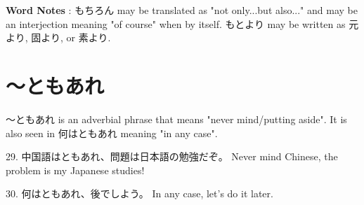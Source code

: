 \par{\textbf{Word Notes }: もちろん may be translated as "not only\dothyp{}\dothyp{}\dothyp{}but also\dothyp{}\dothyp{}\dothyp{}" and may be an interjection meaning "of course" when by itself. もとより may be written as 元より, 固より, or 素より. }
      
\section{～ともあれ}
 
\par{ ～ともあれ is an adverbial phrase that means "never mind\slash putting aside". It is also seen in 何はともあれ meaning "in any case". }

\par{29. 中国語はともあれ、問題は日本語の勉強だぞ。 \hfill\break
Never mind Chinese, the problem is my Japanese studies! }

\par{30. 何はともあれ、後でしよう。 \hfill\break
In any case, let's do it later. }
    